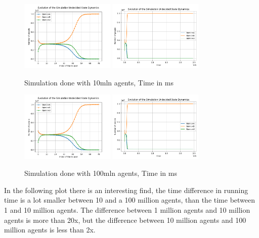 \begin{figure}[!ht]
     \includegraphics[width=0.40\textwidth,height=0.15\textheight]{img/svg/Undecided/10mln/withoutTime.png}
     \centering
     \includegraphics[width=0.40\textwidth,height=0.15\textheight]{img/svg/Undecided/10mln/withTime.png}
     \caption{Simulation done with 10mln agents, Time in ms}
\end{figure}
\begin{figure}[!ht]
     \includegraphics[width=0.40\textwidth,height=0.15\textheight]{img/svg/Undecided/100mln/withoutTime.png}
     \centering
     \includegraphics[width=0.40\textwidth,height=0.15\textheight]{img/svg/Undecided/100mln/withTime.png}
     \caption{Simulation done with 100mln agents, Time in ms}
\end{figure}

In the following plot there is an interesting find, the time difference in running time is a lot smaller between 10 and a 100 million agents, than the time between 1 and 10 million agents. The difference between 1 million agents and 10 million agents is more than 20x, but the difference between 10 million agents and 100 million agents is less than 2x.

